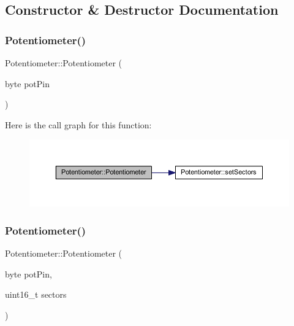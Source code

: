 \subsection{Constructor \& Destructor Documentation}
\mbox{\label{class_potentiometer_a15bc5c613ca3c66b54cb816af5935c1b}} 
\subsubsection{\texorpdfstring{Potentiometer()}{Potentiometer()}\hspace{0.1cm}{\footnotesize\ttfamily [1/2]}}
{\footnotesize\ttfamily Potentiometer\+::\+Potentiometer (\begin{DoxyParamCaption}\item[{byte}]{pot\+Pin }\end{DoxyParamCaption})}

Here is the call graph for this function\+:\nopagebreak
\begin{figure}[H]
\begin{center}
\leavevmode
\includegraphics[width=350pt]{class_potentiometer_a15bc5c613ca3c66b54cb816af5935c1b_cgraph}
\end{center}
\end{figure}
\mbox{\label{class_potentiometer_af91e2477f31efbb3b7ebfedb427007ff}} 
\subsubsection{\texorpdfstring{Potentiometer()}{Potentiometer()}\hspace{0.1cm}{\footnotesize\ttfamily [2/2]}}
{\footnotesize\ttfamily Potentiometer\+::\+Potentiometer (\begin{DoxyParamCaption}\item[{byte}]{pot\+Pin,  }\item[{uint16\+\_\+t}]{sectors }\end{DoxyParamCaption})}

